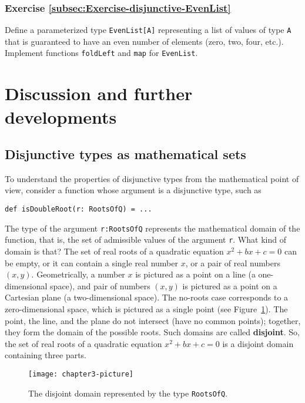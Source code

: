 \subsubsection{Exercise \label{subsec:Exercise-disjunctive-EvenList}\ref{subsec:Exercise-disjunctive-EvenList}}

Define a parameterized type \lstinline!EvenList[A]! representing
a list of values of type \lstinline!A! that is guaranteed to have
an even number of elements (zero, two, four, etc.). Implement functions
\lstinline!foldLeft! and \lstinline!map! for \lstinline!EvenList!.

\section{Discussion and further developments}

\subsection{Disjunctive types as mathematical sets}

To understand the properties of disjunctive types from the mathematical
point of view, consider a function whose argument is a disjunctive
type, such as
\begin{lstlisting}
def isDoubleRoot(r: RootsOfQ) = ...
\end{lstlisting}
The type of the argument \lstinline!r:RootsOfQ! represents the mathematical
domain of the function, that is, the set of admissible values of the
argument \lstinline!r!. What kind of domain is that? The set of real
roots of a quadratic equation $x^{2}+bx+c=0$ can be empty, or it
can contain a single real number $x$, or a pair of real numbers $\left(x,y\right)$.
Geometrically, a number $x$ is pictured as a point on a line (a one-dimensional
space), and pair of numbers $\left(x,y\right)$ is pictured as a point
on a Cartesian plane (a two-dimensional space). The no-roots case
corresponds to a zero-dimensional space, which is pictured as a single
point (see Figure~\ref{fig:RootsOfQ-disjoint-domain}). The point,
the line, and the plane do not intersect (have no common points);
together, they form the domain of the possible roots. Such domains
are called \textbf{disjoint}. So, the set
of real roots of a quadratic equation $x^{2}+bx+c=0$ is a disjoint
domain containing three parts.

\begin{figure}
\begin{centering}
\hspace{-1cm}\texttt{[image: chapter3-picture]}
\par\end{centering}
\vspace{-1.4\baselineskip}
\caption{The disjoint domain represented by the type \lstinline!RootsOfQ!.\label{fig:RootsOfQ-disjoint-domain}}
\end{figure}


